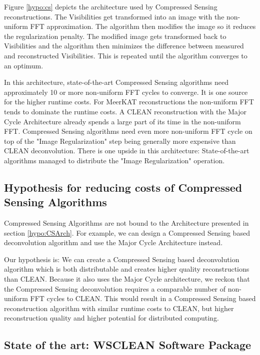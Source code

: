 Figure \ref{hypo:cs} depicts the architecture used by Compressed Sensing reconstructions. The Visibilities get transformed into an image with the non-uniform FFT approximation. The algorithm then modifies the image so it reduces the regularization penalty. The modified image gets transformed back to Visibilities and the algorithm then minimizes the difference between measured and reconstructed Visibilities. This is repeated until the algorithm converges to an optimum.

In this architecture, state-of-the-art Compressed Sensing algorithms need approximately 10 or more non-uniform FFT cycles to converge. It is one source for the higher runtime costs. For MeerKAT reconstructions the non-uniform FFT tends to dominate the runtime costs. A CLEAN reconstruction with the Major Cycle Architecture already spends a large part of its time in the non-uniform FFT. Compressed Sensing algorithms need even more non-uniform FFT cycle on top of the "Image Regularization" step being generally more expensive than CLEAN deconvolution. There is one upside in this architecture: State-of-the-art algorithms managed to distribute the "Image Regularization" operation.

\subsection{Hypothesis for reducing costs of Compressed Sensing Algorithms}
Compressed Sensing Algorithms are not bound to the Architecture presented in section \ref{hypo:CSArch}. For example, we can design a Compressed Sensing based deconvolution algorithm and use the Major Cycle Architecture instead. 

Our hypothesis is: We can create a Compressed Sensing based deconvolution algorithm which is both distributable and creates higher quality reconstructions than CLEAN. Because it also uses the Major Cycle architecture, we reckon that the Compressed Sensing deconvolution requires a comparable number of non-uniform FFT cycles to CLEAN. This would result in a Compressed Sensing based reconstruction algorithm with similar runtime costs to CLEAN, but higher reconstruction quality and higher potential for distributed computing.



\subsection{State of the art: WSCLEAN Software Package}



